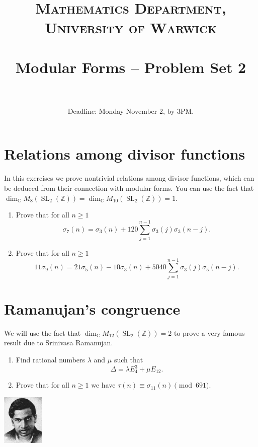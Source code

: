 \documentclass[paper=a4, fontsize=11pt]{scrartcl} %
\title{	
\normalfont \normalsize 
\textsc{Mathematics Department, University of Warwick} \\ [20pt] %
\horrule{0.5pt} \\[0.4cm] %
\huge Modular Forms -- Problem Set 2 \\ %
\horrule{2pt} \\ %
}
\date{Deadline: Monday November 2, by 3PM.}
\numberwithin{equation}{section} %
\numberwithin{figure}{section} %
\numberwithin{table}{section} %
\newcommand{\bbC}{\mathbb{C}}
\newcommand{\bbZ}{\mathbb{Z}}
\newcommand{\CC}{\bbC}
\newcommand{\ZZ}{\bbZ}
\DeclareMathOperator{\SL}{SL}
\begin{document}
\maketitle %


\section{Relations among divisor functions}
In this exercises we prove nontrivial relations among divisor functions,
which can be deduced from their connection with modular forms. You can use
the fact that $\dim_\CC M_8(\SL_2(\ZZ)) = \dim_\CC M_{10}(\SL_2(\ZZ)) = 1$.

\begin{enumerate}
\item Prove that for all $n\geq 1$
\[
\sigma_7(n) = \sigma_3(n)+120\sum_{j=1}^{n-1} \sigma_3(j)\sigma_3(n-j).
\]
\item Prove that for all $n\geq 1$
\[
11\sigma_9(n) = 21\sigma_5(n)-10\sigma_3(n)+5040\sum_{j=1}^{n-1}\sigma_3(j)\sigma_5(n-j).
\]
\end{enumerate}
\section{Ramanujan's congruence}
We will use the fact that $\dim_\CC M_{12}(\SL_2(\ZZ))=2$ to prove a very famous result due to Srinivasa Ramanujan.

\begin{minipage}[t]{.7\textwidth}
  \begin{enumerate}
  \item Find rational numbers $\lambda$ and $\mu$ such that
\[
\Delta =\lambda E_4^3+\mu E_{12}.
\]
\item Prove that for all $n\geq 1$ we have $\tau(n)\equiv \sigma_{11}(n)\pmod{691}$.
  \end{enumerate}
\end{minipage}
\begin{minipage}{.25\textwidth}
  \includegraphics[width=2cm]{../Pictures/Ramanujan1915.jpg}
\end{minipage}
\newpage
\end{document}
